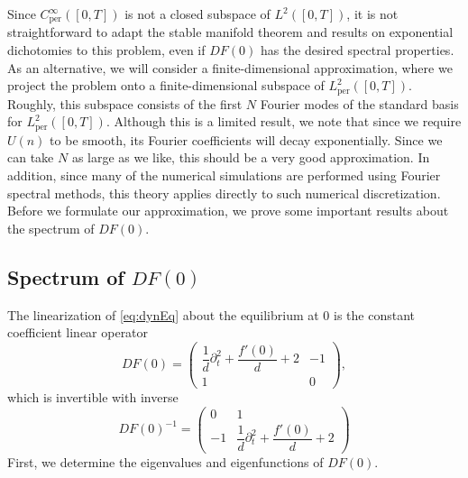 \documentclass[12pt,reqno]{amsart}
\def\per{\textrm{per}}
\theoremstyle{definition}
\begin{document}
Since $C_\per^\infty([0,T])$ is not a closed subspace of $L^2([0,T])$, it is not straightforward to adapt the stable manifold theorem and results on exponential dichotomies to this problem, even if $DF(0)$ has the desired spectral properties. As an alternative, we will consider a finite-dimensional approximation, where we project the problem onto a finite-dimensional subspace of $L_\per^2([0,T])$. Roughly, this subspace consists of the first $N$ Fourier modes of the standard basis for $L_\per^2([0,T])$. Although this is a limited result, we note that since we require $U(n)$ to be smooth, its Fourier coefficients will decay exponentially. Since we can take $N$ as large as we like, this should be a very good approximation. In addition, since many of the numerical simulations are performed using Fourier spectral methods, this theory applies directly to such numerical discretization. Before we formulate our approximation, we prove some important results about the spectrum of $DF(0)$.

\subsection{Spectrum of \texorpdfstring{$DF(0)$}{DF(0)}}

The linearization of \cref{eq:dynEq} about the equilibrium at 0 is the constant coefficient linear operator 
\begin{equation}\label{eq:DF0}
DF(0) = \begin{pmatrix}
\dfrac{1}{d}\partial_t^2 + \dfrac{f'(0)}{d} + 2 & -1 \\ 1 & 0
\end{pmatrix},
\end{equation}
which is invertible with inverse
\begin{equation}\label{eq:DF0inv}
DF(0)^{-1} = \begin{pmatrix}
0 & 1 \\ -1 & \dfrac{1}{d}\partial_t^2 + \dfrac{f'(0)}{d} + 2
\end{pmatrix}
\end{equation}
First, we determine the eigenvalues and eigenfunctions of $DF(0)$.
\end{document}

